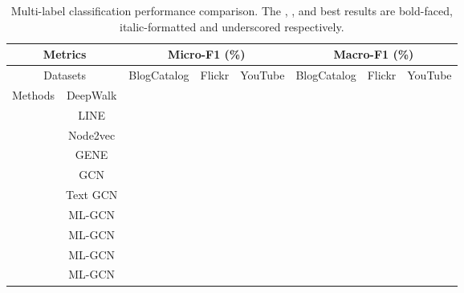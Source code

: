 \documentclass[conference]{IEEEtran}
\begin{document}
\begin{table*}[ht]
\renewcommand{\arraystretch}{1.30}
\centering
\caption{Multi-label classification performance comparison. The , , and  best results are bold-faced, italic-formatted and underscored respectively.}
\label{tab:results}
\begin{tabular}{c|c|c|c|c|c|c|c}
\toprule
\multicolumn{2}{c}{Metrics} & \multicolumn{3}{c}{Micro-F1 (\%)} & \multicolumn{3}{c}{Macro-F1 (\%)} \\
\hline
\multicolumn{2}{c|}{Datasets} & BlogCatalog & Flickr & YouTube & BlogCatalog & Flickr & YouTube\\
\hline
\multirow{10}{4em}{Methods} & DeepWalk & {{\tiny }} & {{\tiny }} &   {{\tiny }} & {{\tiny }} & {{\tiny}} &  {{\tiny}} \\

& LINE & {{\tiny }} & {{\tiny }} &   {{\tiny }} & {{\tiny }} & {{\tiny}} &  {{\tiny}} \\

& Node2vec & {{\tiny }} & {{\tiny }} &   {{\tiny }} & {{\tiny }} & {{\tiny}} &  {{\tiny}} \\

& GENE & {{\tiny }} & {{\tiny }} &   {{\tiny }} & {{\tiny }} & {{\tiny}} &  {{\tiny}} \\

& GCN & {{\tiny }} & \underline{{{\tiny }}} &   {\tiny } & {{\tiny }} & \underline{{{\tiny}}} &  {{\tiny}} \\

& Text GCN & {{\tiny }} & {\tiny } &   {{\tiny }} & {{\tiny }} & {{\tiny}} &  {{\tiny}} \\

& ML-GCN & \underline{{{\tiny }}} & {{\tiny }} & \underline{{\tiny }} & \underline{{{\tiny }}} & {{\tiny}} &  \underline{{{\tiny}}} \\

& ML-GCN & {{\tiny }} & {{\tiny }} &   {{\tiny }} & {{\tiny }} & {{\tiny}} &  {{\tiny}} \\

& ML-GCN & {{\tiny }} & {{\tiny }} &   {{\tiny }} & {{\tiny }} & {{\tiny}} &  {{\tiny}} \\

& ML-GCN & {{\tiny }} & {{\tiny }} &   {{\tiny }} & {{\tiny }} & {{\tiny}} &  {{\tiny}} \\
\bottomrule
\end{tabular}
\end{table*}
\end{document}
